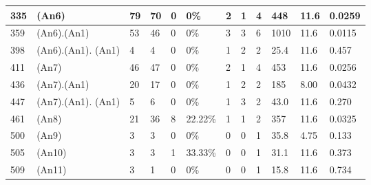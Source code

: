 \begin{tabular}{|l|p{56px}|l|l|l|l|l|l|l|l|l|l|}
\hline
       335 & (An6) &         79 &         70 &          0 &        0\% &          2 &          1 &          4 &        448 &       11.6 &     0.0259 \\
\hline
       359 & (An6).(An1) &         53 &         46 &          0 &        0\% &          3 &          3 &          6 &       1010 &       11.6 &     0.0115 \\
\hline
       398 & (An6).(An1). (An1) &          4 &          4 &          0 &        0\% &          1 &          2 &          2 &       25.4 &       11.6 &      0.457 \\
\hline
       411 & (An7) &         46 &         47 &          0 &        0\% &          2 &          1 &          4 &        453 &       11.6 &     0.0256 \\
\hline
       436 & (An7).(An1) &         20 &         17 &          0 &        0\% &          1 &          2 &          2 &        185 &       8.00 &     0.0432 \\
\hline
       447 & (An7).(An1). (An1) &          5 &          6 &          0 &        0\% &          1 &          3 &          2 &       43.0 &       11.6 &      0.270 \\
\hline
       461 & (An8) &         21 &         36 &          8 &    22.22\% &          1 &          1 &          2 &        357 &       11.6 &     0.0325 \\
\hline
       500 & (An9) &          3 &          3 &          0 &        0\% &          0 &          0 &          1 &       35.8 &       4.75 &      0.133 \\
\hline
       505 & (An10) &          3 &          3 &          1 &    33.33\% &          0 &          0 &          1 &       31.1 &       11.6 &      0.373 \\
\hline
       509 & (An11) &          3 &          1 &          0 &        0\% &          0 &          0 &          1 &       15.8 &       11.6 &      0.734 \\
\hline
\end{tabular}
\vspace{10px}

